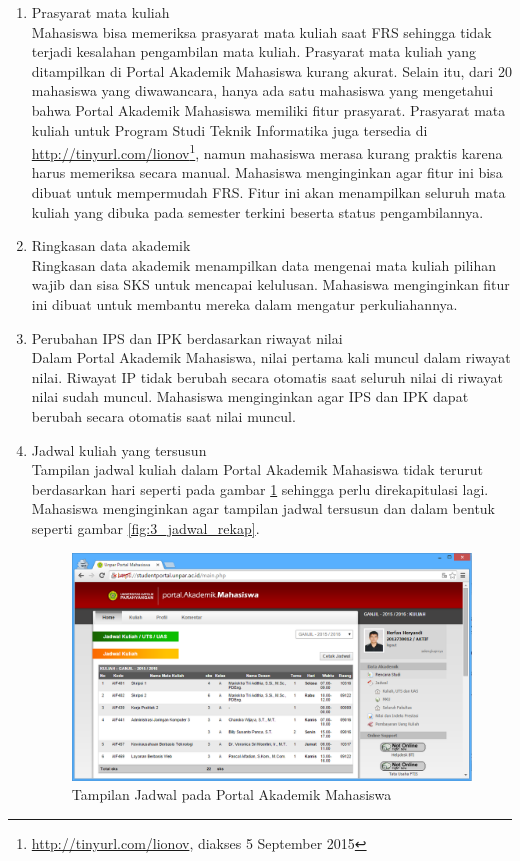 \begin{enumerate}
	\item Prasyarat mata kuliah\\
	Mahasiswa bisa memeriksa prasyarat mata kuliah saat FRS sehingga tidak terjadi kesalahan pengambilan mata kuliah. Prasyarat mata kuliah yang ditampilkan di Portal Akademik Mahasiswa kurang akurat. Selain itu, dari 20 mahasiswa yang diwawancara, hanya ada satu mahasiswa yang mengetahui bahwa Portal Akademik Mahasiswa memiliki fitur prasyarat. Prasyarat mata kuliah untuk Program Studi Teknik Informatika juga tersedia di \url{http://tinyurl.com/lionov}\footnote{\url{http://tinyurl.com/lionov}, diakses 5 September 2015}, namun mahasiswa merasa kurang praktis karena harus memeriksa secara manual. Mahasiswa menginginkan agar fitur ini bisa dibuat untuk mempermudah FRS. Fitur ini akan menampilkan seluruh mata kuliah yang dibuka pada semester terkini beserta status pengambilannya.
	\item Ringkasan data akademik\\
	Ringkasan data akademik menampilkan data mengenai mata kuliah pilihan wajib dan sisa SKS untuk mencapai kelulusan. Mahasiswa menginginkan fitur ini dibuat untuk membantu mereka dalam mengatur perkuliahannya.
	\item Perubahan IPS dan IPK berdasarkan riwayat nilai\\
	Dalam Portal Akademik Mahasiswa, nilai pertama kali muncul dalam riwayat nilai. Riwayat IP tidak berubah secara otomatis saat seluruh nilai di riwayat nilai sudah muncul. Mahasiswa menginginkan agar IPS dan IPK dapat berubah secara otomatis saat nilai muncul.
	\item Jadwal kuliah yang tersusun\\
	Tampilan jadwal kuliah dalam Portal Akademik Mahasiswa tidak terurut berdasarkan hari seperti pada gambar \ref{fig:3_jadwal_portal} sehingga perlu direkapitulasi lagi. Mahasiswa menginginkan agar tampilan jadwal tersusun dan dalam bentuk seperti gambar \ref{fig:3_jadwal_rekap}.
		\begin{figure}[H]
			\centering
			\includegraphics[scale=0.5]{Gambar/jadwal-portal}
			\caption{Tampilan Jadwal pada Portal Akademik Mahasiswa} 
			\label{fig:3_jadwal_portal}
		\end{figure}
		

\end{enumerate}
